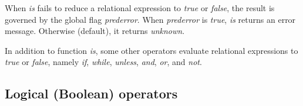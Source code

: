 \documentclass[../Maxima_Workbook.tex]{subfiles}
\begin{document}
\vspace{-2mm} When \emph{is} fails to reduce a relational expression to \emph{true} or \emph{false}, the result is governed by the global flag \emph{prederror}. When \emph{prederror} is \emph{true}, \emph{is} returns an error message. Otherwise (default), it returns \emph{unknown}.

\lz In addition to function \emph{is}, some other operators evaluate relational expressions to \emph{true} or \emph{false}, namely \emph{if}, \emph{while}, \emph{unless}, \emph{and}, \emph{or}, and \emph{not}.

\subsection{Logical (Boolean) operators}
\end{document}
